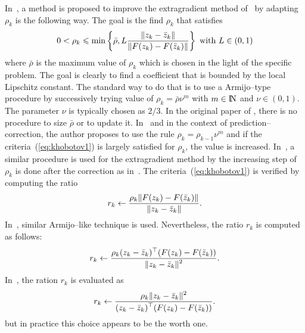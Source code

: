 In~\citep{Khobotov_CMMP1987}, a method is proposed to improve the extragradient method of~\citet{Korpelevich1976} by adapting $\rho_k$ is the following way. The goal is the find $\rho_k$ that satisfies
  \begin{equation}
    \label{eq:khobotov1}
    0 < \rho_k \leq \min\left\{\bar\rho,L \Frac{\|z_k-\bar z_k\|}{\|F(z_k)-F(\bar z_k)\|}\right\}\text{ with } L \in (0,1)
  \end{equation}
where $\bar \rho$ is the maximum value of $\rho_k$ which is chosen in the light of the specific problem.  The goal is clearly to find a coefficient that is bounded by the local Lipschitz constant. The standard way to do that is to use a Armijo--type procedure by successively trying value of $\rho_k = \bar \rho \nu^m$ with $m\in\mathrm{I\!N}$ and $\nu\in (0,1)$. The parameter $\nu$ is typically chosen as $2/3$.  In the original paper of \cite{Khobotov_CMMP1987}, there is no procedure to size $\bar \rho$ or to update it. In~\cite{He.Liao_JOTA2002} and in the context of prediction--correction, the author proposes to use the rule $\rho_k =  \rho_{k-1} \nu^m$ and  if the criteria~(\ref{eq:khobotov1}) is largely satisfied for $\rho_{k}$, the value is increased.
In~\citep{Han.Lo_CMA2002},  a similar procedure is used for the extragradient method by the increasing step of $\rho_k$ is done after the correction as in~\cite{He.Liao_JOTA2002}.
 The criteria~(\ref{eq:khobotov1}) is  verified by computing the ratio
\begin{equation}
  \label{eq:Khobotov-r}
  r _{k} \leftarrow \Frac{\rho_k \|F(z_k)-F(\bar z_k)\|}{ \|z_k-\bar z_k\| }.
\end{equation}
 In~\citep{Solodov.Tseng1996}, similar Armijo--like technique is used. Nevertheless, the ratio $r_k$ is computed as follows:
\begin{equation}
  \label{eq:SolodovTseng-r}
  r _{k} \leftarrow \Frac{\rho_k(z_k-\bar z_k)^\top(F(z_k)-F(\bar z_k))}{ \|z_k-\bar z_k\|^2 }.
\end{equation}
In~\cite{Han.Sun_CMA2004}, the ration $r_k$ is evaluated as
\begin{equation}
  \label{eq:HanSun-r}
  r _{k} \leftarrow \Frac{\rho_k \|z_k-\bar z_k\|^2 }{(z_k-\bar z_k)^\top(F(z_k)-F(\bar z_k))}.
\end{equation}
but in practice this choice appears to be the worth one. 


